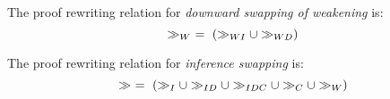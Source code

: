 \begin{definition}[$\swapWD$]
\end{definition}




\begin{definition}[$\swapW$]
\label{definition:SwappingWeakening}
The proof rewriting relation for \emph{downward swapping of weakening} is:
$$
\gg_{W} \ = \ (\gg_{WI} \cup \gg_{WD})
$$
\end{definition}


\begin{definition}[$\swap$] 
\label{definition:Swapping}
The proof rewriting relation for \emph{inference swapping} is:
$$
\gg \ = \ (\gg_I \cup \gg_{ID} \cup \gg_{IDC} \cup \gg_C \cup \gg_{W})
$$
\end{definition}
